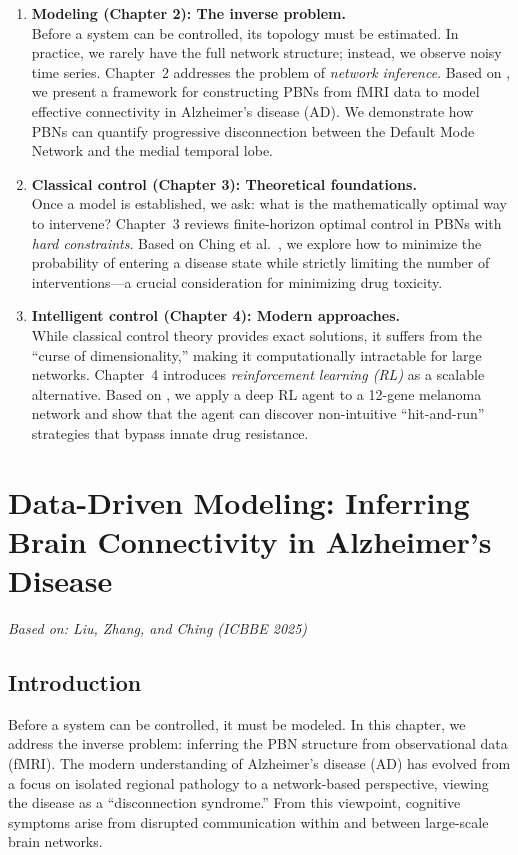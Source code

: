 \documentclass[12pt, a4paper]{report}
\begin{document}
\begin{enumerate}
	\item \textbf{Modeling (Chapter 2): The inverse problem.} \\
	Before a system can be controlled, its topology must be estimated. In practice, we rarely have the full network structure; instead, we observe noisy time series. Chapter~2 addresses the problem of \textit{network inference}. Based on \cite{liu2025alzheimers}, we present a framework for constructing PBNs from fMRI data to model effective connectivity in Alzheimer's disease (AD). We demonstrate how PBNs can quantify progressive disconnection between the Default Mode Network and the medial temporal lobe.
	
	\item \textbf{Classical control (Chapter 3): Theoretical foundations.} \\
	Once a model is established, we ask: what is the mathematically optimal way to intervene? Chapter~3 reviews finite-horizon optimal control in PBNs with \textit{hard constraints}. Based on Ching et al.~\cite{ching2009optimal}, we explore how to minimize the probability of entering a disease state while strictly limiting the number of interventions---a crucial consideration for minimizing drug toxicity.
	
	\item \textbf{Intelligent control (Chapter 4): Modern approaches.} \\
	While classical control theory provides exact solutions, it suffers from the ``curse of dimensionality,'' making it computationally intractable for large networks. Chapter~4 introduces \textit{reinforcement learning (RL)} as a scalable alternative. Based on \cite{liu2025melanoma}, we apply a deep RL agent to a 12-gene melanoma network and show that the agent can discover non-intuitive ``hit-and-run'' strategies that bypass innate drug resistance.
\end{enumerate}
	


\chapter{Data-Driven Modeling: Inferring Brain Connectivity in Alzheimer's Disease}
\label{chap:modeling}


\textit{Based on: Liu, Zhang, and Ching (ICBBE 2025)~\cite{liu2025alzheimers}}

\section{Introduction}
Before a system can be controlled, it must be modeled. In this chapter, we address the inverse problem: inferring the PBN structure from observational data (fMRI). The modern understanding of Alzheimer's disease (AD) has evolved from a focus on isolated regional pathology to a network-based perspective, viewing the disease as a ``disconnection syndrome.'' From this viewpoint, cognitive symptoms arise from disrupted communication within and between large-scale brain networks.
\end{document}
